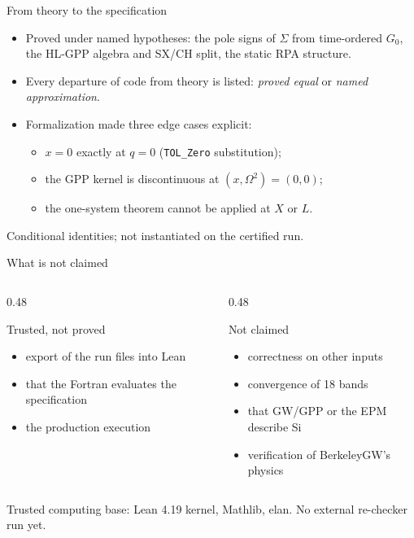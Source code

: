 \documentclass[11pt,aspectratio=169]{beamer}
\begin{document}
\begin{frame}{From theory to the specification}
\begin{itemize}
\item Proved under named hypotheses: the pole signs of $\Sigma$ from time-ordered $G_0$, the HL-GPP
      algebra and SX/CH split, the static RPA structure.
\item Every departure of code from theory is listed: \emph{proved equal} or \emph{named approximation}.
\item Formalization made three edge cases explicit:
  \begin{itemize}
  \item $x = 0$ exactly at $q = 0$ (\texttt{TOL\_Zero} substitution);
  \item the GPP kernel is discontinuous at $(x,\Omega^2)=(0,0)$;
  \item the one-system theorem cannot be applied at $X$ or $L$.
  \end{itemize}
\end{itemize}
\vfill
\scriptsize Conditional identities; not instantiated on the certified run.
\end{frame}

\begin{frame}{What is not claimed}
\begin{columns}[T]
\begin{column}{0.48\textwidth}
\begin{block}{Trusted, not proved}
\begin{itemize}
\item export of the run files into Lean
\item that the Fortran evaluates the specification
\item the production execution
\end{itemize}
\end{block}
\end{column}
\begin{column}{0.48\textwidth}
\begin{alertblock}{Not claimed}
\begin{itemize}
\item correctness on other inputs
\item convergence of 18 bands
\item that GW/GPP or the EPM describe Si
\item verification of BerkeleyGW's physics
\end{itemize}
\end{alertblock}
\end{column}
\end{columns}
\vfill
\small Trusted computing base: Lean 4.19 kernel, Mathlib, elan. No external re-checker run yet.
\end{frame}
\end{document}
